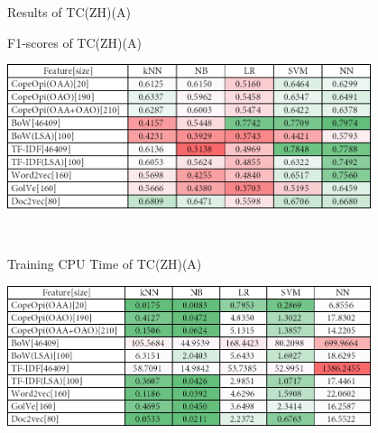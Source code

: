 \caption{Results of TC(ZH)(A)}
\label{tab:tc_zh_a}
\centering
\begin{subtable}{\textwidth}
	\centering
	\caption{F1-scores of TC(ZH)(A)}
	\includegraphics[width=0.8\textwidth]{./figure/02B1.png}
\end{subtable}\\[1em]
\begin{subtable}{\textwidth}
	\centering
	\caption{Training CPU Time of TC(ZH)(A)}
	\includegraphics[width=0.8\textwidth]{./figure/02B1t.png}
\end{subtable}
